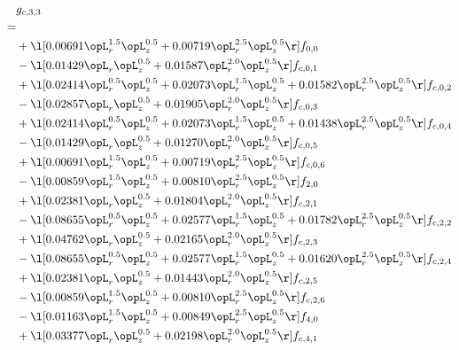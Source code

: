 \begin{alignat}{2} 
\label{eq:g_33_0} 
& g_{c,3,3} \nonumber \\ 
 = \\ 
& + \l[  0.00691 \opL_r^{1.5} \opL_z^{0.5} +  0.00719 \opL_r^{2.5} \opL_z^{0.5}  \r] f_{0,0} \nonumber \\ 
& - \l[  0.01429 \opL_r \opL_z^{0.5} +  0.01587 \opL_r^{2.0} \opL_z^{0.5}  \r] f_{c,0,1} \nonumber \\ 
& + \l[  0.02414 \opL_r^{0.5} \opL_z^{0.5} +  0.02073 \opL_r^{1.5} \opL_z^{0.5} +  0.01582 \opL_r^{2.5} \opL_z^{0.5}  \r] f_{c,0,2} \nonumber \\ 
& - \l[  0.02857 \opL_r \opL_z^{0.5} +  0.01905 \opL_r^{2.0} \opL_z^{0.5}  \r] f_{c,0,3} \nonumber \\ 
& + \l[  0.02414 \opL_r^{0.5} \opL_z^{0.5} +  0.02073 \opL_r^{1.5} \opL_z^{0.5} +  0.01438 \opL_r^{2.5} \opL_z^{0.5}  \r] f_{c,0,4} \nonumber \\ 
& - \l[  0.01429 \opL_r \opL_z^{0.5} +  0.01270 \opL_r^{2.0} \opL_z^{0.5}  \r] f_{c,0,5} \nonumber \\ 
& + \l[  0.00691 \opL_r^{1.5} \opL_z^{0.5} +  0.00719 \opL_r^{2.5} \opL_z^{0.5}  \r] f_{c,0,6} \nonumber \\ 
& - \l[  0.00859 \opL_r^{1.5} \opL_z^{0.5} +  0.00810 \opL_r^{2.5} \opL_z^{0.5}  \r] f_{2,0} \nonumber \\ 
& + \l[  0.02381 \opL_r \opL_z^{0.5} +  0.01804 \opL_r^{2.0} \opL_z^{0.5}  \r] f_{c,2,1} \nonumber \\ 
& - \l[  0.08655 \opL_r^{0.5} \opL_z^{0.5} +  0.02577 \opL_r^{1.5} \opL_z^{0.5} +  0.01782 \opL_r^{2.5} \opL_z^{0.5}  \r] f_{c,2,2} \nonumber \\ 
& + \l[  0.04762 \opL_r \opL_z^{0.5} +  0.02165 \opL_r^{2.0} \opL_z^{0.5}  \r] f_{c,2,3} \nonumber \\ 
& - \l[  0.08655 \opL_r^{0.5} \opL_z^{0.5} +  0.02577 \opL_r^{1.5} \opL_z^{0.5} +  0.01620 \opL_r^{2.5} \opL_z^{0.5}  \r] f_{c,2,4} \nonumber \\ 
& + \l[  0.02381 \opL_r \opL_z^{0.5} +  0.01443 \opL_r^{2.0} \opL_z^{0.5}  \r] f_{c,2,5} \nonumber \\ 
& - \l[  0.00859 \opL_r^{1.5} \opL_z^{0.5} +  0.00810 \opL_r^{2.5} \opL_z^{0.5}  \r] f_{c,2,6} \nonumber \\ 
& - \l[  0.01163 \opL_r^{1.5} \opL_z^{0.5} +  0.00849 \opL_r^{2.5} \opL_z^{0.5}  \r] f_{4,0} \nonumber \\ 
& + \l[  0.03377 \opL_r \opL_z^{0.5} +  0.02198 \opL_r^{2.0} \opL_z^{0.5}  \r] f_{c,4,1} \nonumber \\ 

\end{alignat}
